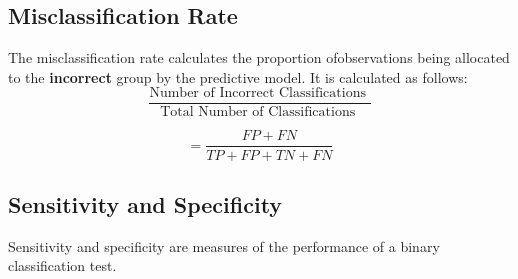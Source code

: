 \documentclass[]{report}
\begin{document}
\subsection*{Misclassification Rate}
The misclassification rate calculates the proportion ofobservations being allocated to the \textbf{incorrect} group by the predictive model. It is calculated as follows:
\[ \frac{
	\mbox{Number of Incorrect Classifications }}{\mbox{Total Number of Classifications }} \]

\[ = \frac{FP + FN}{TP+FP+TN+FN}\]

\subsection*{Sensitivity and Specificity}
Sensitivity and specificity are measures of the performance of a binary classification
test.
\end{document}
